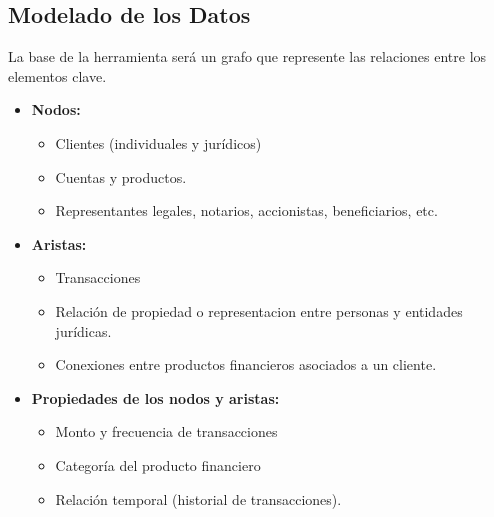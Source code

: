 \subsection{Modelado de los Datos}
La base de la herramienta será un grafo que represente las relaciones entre los elementos clave.
\begin{itemize}
    \item \textbf{Nodos:} 
    \begin{itemize}
        \item Clientes (individuales y jurídicos)
        \item Cuentas y productos.
        \item Representantes legales, notarios, accionistas, beneficiarios, etc.
    \end{itemize}
    \item \textbf{Aristas:}
    \begin{itemize}
        \item Transacciones
        \item Relación de propiedad o representacion entre personas y entidades jurídicas.
        \item Conexiones entre productos financieros asociados a un cliente.
    \end{itemize}
    \item \textbf{Propiedades de los nodos y aristas: }
    \begin{itemize}
        \item Monto y frecuencia de transacciones
        \item Categoría del producto financiero
        \item Relación temporal (historial de transacciones).
    \end{itemize}
\end{itemize}


